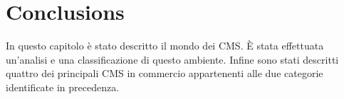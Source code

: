 \section{Conclusions}
\label{cms_concl}
In questo capitolo è stato descritto il mondo dei CMS. È stata effettuata un'analisi e una classificazione di questo ambiente. Infine sono stati descritti quattro dei principali CMS in commercio appartenenti alle due categorie identificate in precedenza.